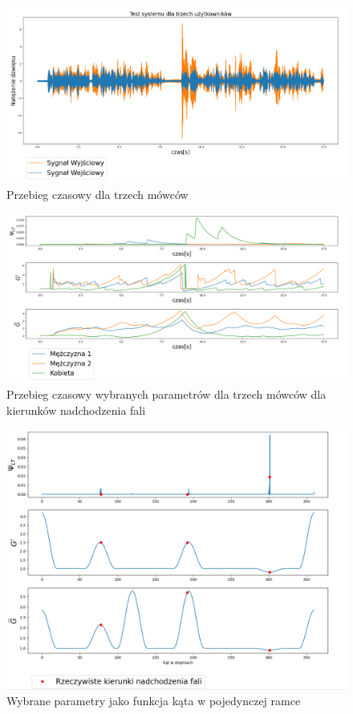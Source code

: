 \begin{figure}[h]
    \centering
    \includegraphics[width=\textwidth]{Images/multi_user.png}
    \caption{Przebieg czasowy dla trzech mówców}
    \label{fig:multi_user}
\end{figure}

\begin{figure}[h]
    \centering
    \includegraphics[width=\textwidth]{Images/multi_user_params_in_time.png}
    \caption{Przebieg czasowy wybranych parametrów dla trzech mówców dla kierunków nadchodzenia fali}
    \label{fig:multi_user_params_in_time}
\end{figure}

\begin{figure}[h]
    \centering
    \includegraphics[width=\textwidth]{Images/multi_user_params_in_angle.png}
    \caption{Wybrane parametry jako funkcja kąta w pojedynczej ramce}
    \label{fig:multi_user_params_in_angle}
\end{figure}

